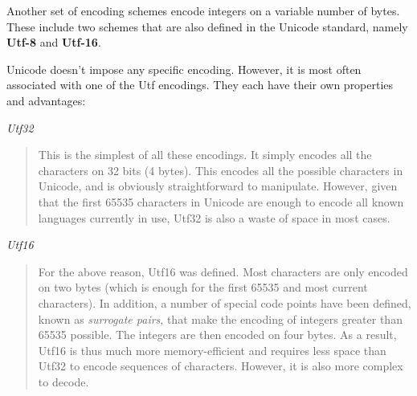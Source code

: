 \documentclass[letterpaper,10pt,english]{sphinxmanual}
\begin{document}
Another set of encoding schemes encode integers on a variable number of bytes.
These include two schemes that are also defined in the Unicode standard, namely
\textbf{Utf-8} and \textbf{Utf-16}.

Unicode doesn't impose any specific encoding. However, it is most often
associated with one of the Utf encodings. They each have their own properties
and advantages:

\emph{Utf32}
\begin{quote}

This is the simplest of all these encodings. It simply encodes all the
characters on 32 bits (4 bytes). This encodes all the possible characters in
Unicode, and is obviously straightforward to manipulate. However, given that
the first 65535 characters in Unicode are enough to encode all known
languages currently in use, Utf32 is also a waste of space in most cases.
\end{quote}

\emph{Utf16}
\begin{quote}

For the above reason, Utf16 was defined. Most characters are only encoded on
two bytes (which is enough for the first 65535 and most current characters).
In addition, a number of special code points have been defined, known as
\emph{surrogate pairs}, that make the encoding of integers greater than 65535
possible. The integers are then encoded on four bytes.  As a result, Utf16 is
thus much more memory-efficient and requires less space than Utf32 to encode
sequences of characters. However, it is also more complex to decode.
\end{quote}
\end{document}
